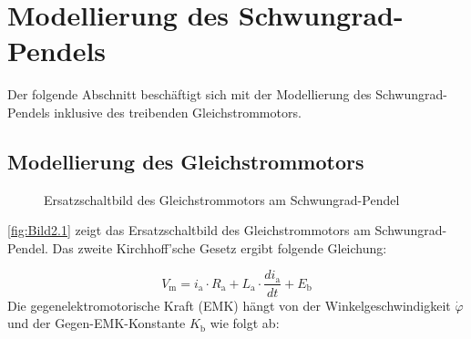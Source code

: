 \pagestyle{aaron}
\section{Modellierung des Schwungrad-Pendels} \label{sec:Modellierung}

Der folgende Abschnitt beschäftigt sich mit der Modellierung des Schwungrad-Pendels inklusive des treibenden Gleichstrommotors.

\subsection{Modellierung des Gleichstrommotors}

\begin{figure}[H]
    \centering
    \caption[Ersatzschaltbild Gleichstrommotor]{Ersatzschaltbild des Gleichstrommotors am Schwungrad-Pendel}
    \label{fig:Bild2.1}
\end{figure}

\autoref{fig:Bild2.1} zeigt das Ersatzschaltbild des Gleichstrommotors am Schwungrad-Pendel. Das zweite Kirchhoff'sche Gesetz ergibt folgende Gleichung:

\begin{equation} \label{eq:Gleichung2.1}
    V_{\mathrm{m}} = i_{\mathrm{a}} \cdot R_{\mathrm{a}} + L_{\mathrm{a}} \cdot \frac{di_{\mathrm{a}}}{dt} + E_{\mathrm{b}}
\end{equation}
\newline
Die gegenelektromotorische Kraft (EMK) hängt von der Winkelgeschwindigkeit $\dot\varphi$ und der Gegen-EMK-Konstante $K_{\mathrm{b}}$ wie folgt ab:

